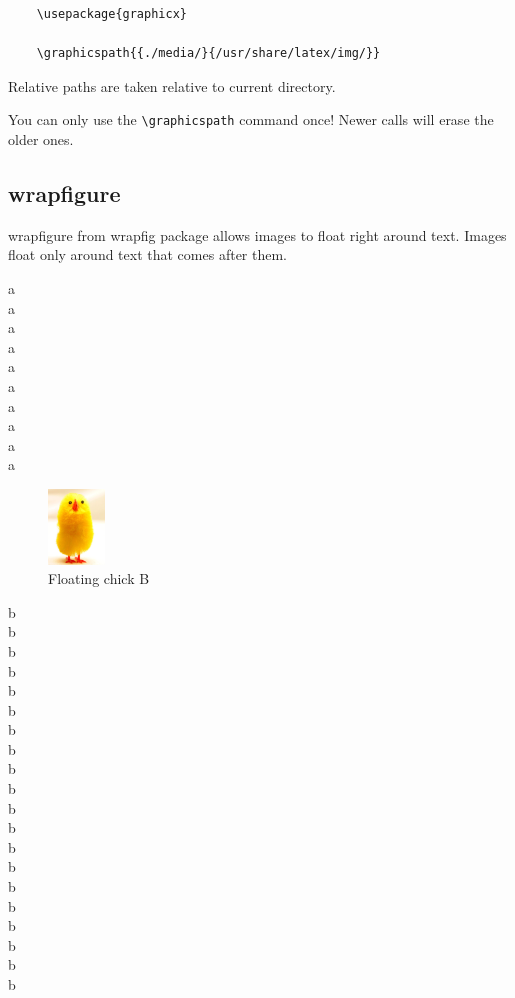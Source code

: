 \documentclass[12pt]{article}
\begin{document}
  \begin{lstlisting}
    \usepackage{graphicx}

    \graphicspath{{./media/}{/usr/share/latex/img/}}
  \end{lstlisting}

  Relative paths are taken relative to current directory.

  You can only use the \lstinline|\graphicspath| command once! Newer calls will erase the older ones.

%

  \subsection{wrapfigure}\label{wrapfigure}%

    wrapfigure from wrapfig package allows images to float right around text.
    Images float only around text that comes after them.

    a \\ a \\ a \\ a\\ a \\ a \\ a \\ a \\ a\\ a \\

    \begin{figure}
      \includegraphics[height=2cm]{image.png}
      \caption{Floating chick B}
    \end{figure}

    b \\ b \\ b \\ b\\ b \\ b \\ b \\ b \\ b\\ b \\
    b \\ b \\ b \\ b\\ b \\ b \\ b \\ b \\ b\\ b \\
\end{document}
